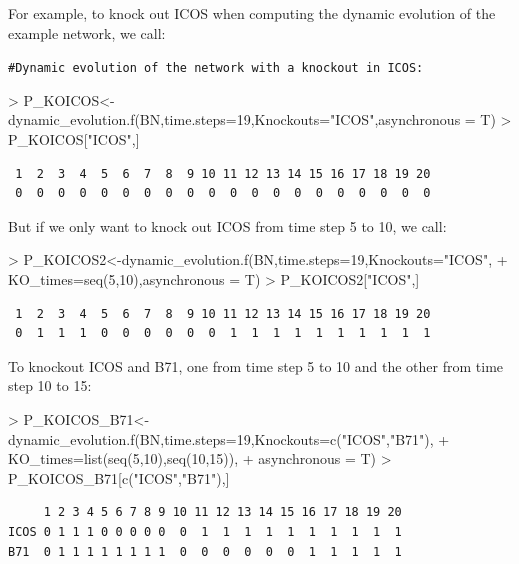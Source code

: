 \documentclass[a4paper]{article}
\begin{document}
For example, to knock out ICOS when computing the dynamic evolution of the example network, we call:
\begin{Schunk}
\end{Schunk}
\texttt{\#Dynamic evolution of the network with a knockout in ICOS:}
\begin{Schunk}
\begin{Sinput}
> P_KOICOS<-dynamic_evolution.f(BN,time.steps=19,Knockouts="ICOS",asynchronous = T)
> P_KOICOS["ICOS",]
\end{Sinput}
\end{Schunk}
\begin{verbatim}
 1  2  3  4  5  6  7  8  9 10 11 12 13 14 15 16 17 18 19 20 
 0  0  0  0  0  0  0  0  0  0  0  0  0  0  0  0  0  0  0  0 
\end{verbatim}
But if we only want to knock out ICOS from time step 5 to 10, we call:
\begin{Schunk}
\begin{Sinput}
> P_KOICOS2<-dynamic_evolution.f(BN,time.steps=19,Knockouts="ICOS",
+                                KO_times=seq(5,10),asynchronous = T)
> P_KOICOS2["ICOS",]
\end{Sinput}
\end{Schunk}
\begin{verbatim}
 1  2  3  4  5  6  7  8  9 10 11 12 13 14 15 16 17 18 19 20 
 0  1  1  1  0  0  0  0  0  0  1  1  1  1  1  1  1  1  1  1 
\end{verbatim}

To knockout ICOS and B71, one from time step 5 to 10 and the other from time step 10 to 15:
\begin{Schunk}
\begin{Sinput}
> P_KOICOS_B71<-dynamic_evolution.f(BN,time.steps=19,Knockouts=c("ICOS","B71"), 
+                                   KO_times=list(seq(5,10),seq(10,15)),
+                                   asynchronous = T)
> P_KOICOS_B71[c("ICOS","B71"),]
\end{Sinput}
\end{Schunk}
\begin{verbatim}
     1 2 3 4 5 6 7 8 9 10 11 12 13 14 15 16 17 18 19 20
ICOS 0 1 1 1 0 0 0 0 0  0  1  1  1  1  1  1  1  1  1  1
B71  0 1 1 1 1 1 1 1 1  0  0  0  0  0  0  1  1  1  1  1
\end{verbatim}
\end{document}
